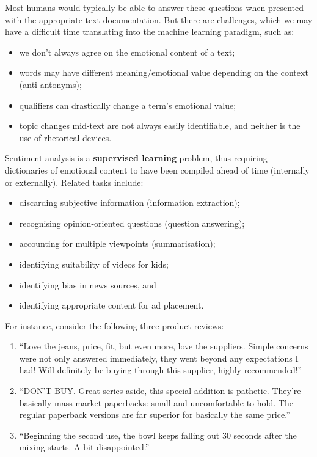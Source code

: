 Most humans would typically be able to answer these questions when presented with the appropriate text documentation. But there are challenges, which we may have a difficult time translating into the machine learning paradigm, such as: 
\begin{itemize}[noitemsep]
\item we don't always agree on the emotional content of a text;
\item words may have different meaning/emotional value depending on the context (anti-antonyms);
\item qualifiers can drastically change a term's emotional value;
\item topic changes mid-text are not always easily identifiable, and neither is the use of rhetorical devices.
\end{itemize}
Sentiment analysis is a \textbf{supervised learning} problem, thus requiring dictionaries of emotional content to have been compiled ahead of time (internally or externally). Related tasks include: \begin{itemize}[noitemsep]
\item discarding subjective information (information extraction);
\item recognising opinion-oriented questions (question answering);
\item accounting for multiple viewpoints (summarisation);
\item identifying suitability of videos for kids;
\item identifying bias in news sources, and 
\item identifying appropriate content for ad placement.
\end{itemize}
For instance, consider the following three product reviews: 
\begin{enumerate}[noitemsep]
\item ``Love the jeans, price, fit, but even more, love the suppliers. Simple concerns were not only answered immediately, they went beyond any expectations I had! Will definitely be buying through this supplier, highly recommended!''
\item ``DON'T BUY. Great series aside, this special addition is pathetic. They're basically mass-market paperbacks: small and uncomfortable to hold. The regular paperback versions are far superior for basically the same price.''
\item ``Beginning the second use, the bowl keeps falling out 30 seconds after the mixing starts. A bit disappointed.''
\end{enumerate}
